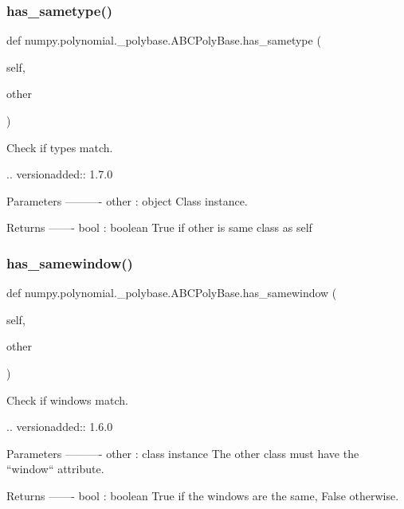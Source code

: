 \subsubsection{\texorpdfstring{has\+\_\+sametype()}{has\_sametype()}}
{\footnotesize\ttfamily def numpy.\+polynomial.\+\_\+polybase.\+A\+B\+C\+Poly\+Base.\+has\+\_\+sametype (\begin{DoxyParamCaption}\item[{}]{self,  }\item[{}]{other }\end{DoxyParamCaption})}

\begin{DoxyVerb}Check if types match.

.. versionadded:: 1.7.0

Parameters
----------
other : object
    Class instance.

Returns
-------
bool : boolean
    True if other is same class as self\end{DoxyVerb}
 \mbox{\label{classnumpy_1_1polynomial_1_1__polybase_1_1ABCPolyBase_a8825e7bb7baec17b7557924d08f6d918}} 
\subsubsection{\texorpdfstring{has\+\_\+samewindow()}{has\_samewindow()}}
{\footnotesize\ttfamily def numpy.\+polynomial.\+\_\+polybase.\+A\+B\+C\+Poly\+Base.\+has\+\_\+samewindow (\begin{DoxyParamCaption}\item[{}]{self,  }\item[{}]{other }\end{DoxyParamCaption})}

\begin{DoxyVerb}Check if windows match.

.. versionadded:: 1.6.0

Parameters
----------
other : class instance
    The other class must have the ``window`` attribute.

Returns
-------
bool : boolean
    True if the windows are the same, False otherwise.\end{DoxyVerb}
 \mbox{\label{classnumpy_1_1polynomial_1_1__polybase_1_1ABCPolyBase_ab9e8e72a70d5069aecc418fd3b3d1d42}} 
